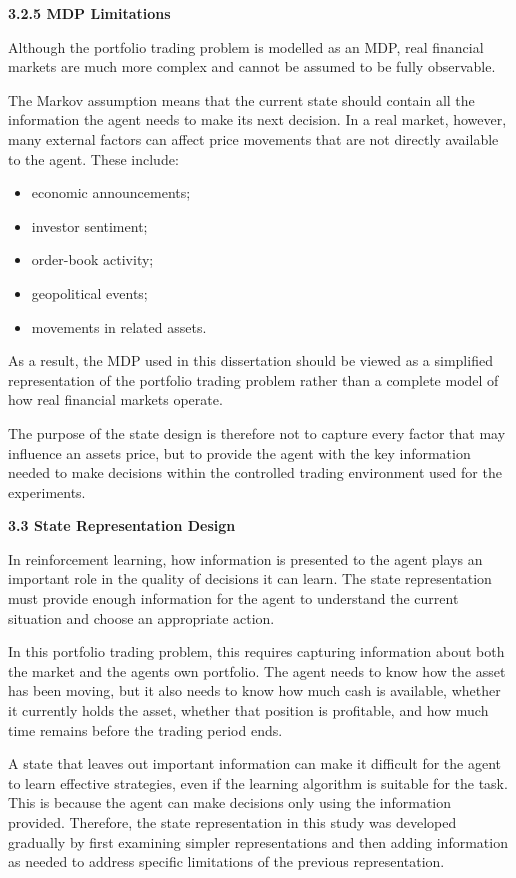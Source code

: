 \textbf{3.2.5 MDP Limitations}

Although the portfolio trading problem is modelled as an MDP, real
financial markets are much more complex and cannot be assumed to be
fully observable.

The Markov assumption means that the current state should contain all
the information the agent needs to make its next decision. In a real
market, however, many external factors can affect price movements that
are not directly available to the agent. These include:

\begin{itemize}
\item
  economic announcements;
\item
  investor sentiment;
\item
  order-book activity;
\item
  geopolitical events;
\item
  movements in related assets.
\end{itemize}

As a result, the MDP used in this dissertation should be viewed as a
simplified representation of the portfolio trading problem rather than a
complete model of how real financial markets operate.

The purpose of the state design is therefore not to capture every factor
that may influence an asset\textquotesingle s price, but to provide the
agent with the key information needed to make decisions within the
controlled trading environment used for the experiments.

\textbf{3.3 State Representation Design}

In reinforcement learning, how information is presented to the agent
plays an important role in the quality of decisions it can learn. The
state representation must provide enough information for the agent to
understand the current situation and choose an appropriate action.

In this portfolio trading problem, this requires capturing information
about both the market and the agent\textquotesingle s own portfolio. The
agent needs to know how the asset has been moving, but it also needs to
know how much cash is available, whether it currently holds the asset,
whether that position is profitable, and how much time remains before
the trading period ends.

A state that leaves out important information can make it difficult for
the agent to learn effective strategies, even if the learning algorithm
is suitable for the task. This is because the agent can make decisions
only using the information provided. Therefore, the state representation
in this study was developed gradually by first examining simpler
representations and then adding information as needed to address
specific limitations of the previous representation.

